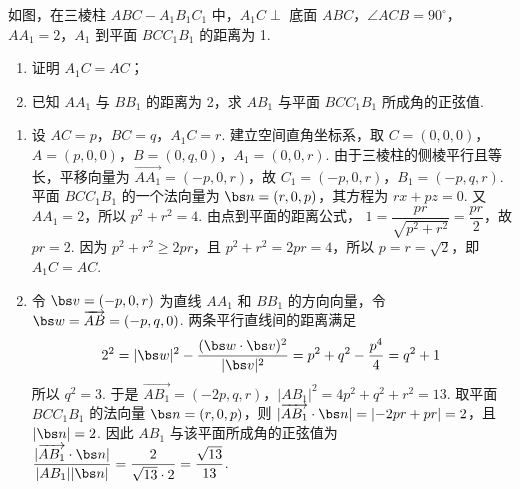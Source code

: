 \begin{problem}
如图，在三棱柱 \( ABC-A_1B_1C_1 \) 中，\( A_1C\perp \) 底面 \(ABC\)，\( \angle ACB=90^\circ \)，\( AA_1=2 \)，\(A_1\) 到平面 \(BCC_1B_1\) 的距离为 1.

\begin{enumerate}
\item 证明 \( A_1C=AC \)；
\item 已知 \(AA_1\) 与 \(BB_1\) 的距离为 2，求 \(AB_1\) 与平面 \(BCC_1B_1\) 所成角的正弦值.
\end{enumerate}

\end{problem}

\begin{solution}
\begin{enumerate}
\item 设 \(AC=p\)，\(BC=q\)，\(A_1C=r\). 建立空间直角坐标系，取
\(C=(0,0,0)\)，\(A=(p,0,0)\)，\(B=(0,q,0)\)，\(A_1=(0,0,r)\). 由于三棱柱的侧棱平行且等长，平移向量为
\(\overrightarrow{AA_1}=(-p,0,r)\)，故 \(C_1=(-p,0,r)\)，\(B_1=(-p,q,r)\). 平面 \(BCC_1B_1\) 的一个法向量为
\(\bs n=(r,0,p)\)，其方程为 \(rx+pz=0\). 又 \(AA_1=2\)，所以
\(p^2+r^2=4\). 由点到平面的距离公式，
\(1=\dfrac{pr}{\sqrt{p^2+r^2}}=\dfrac{pr}{2}\)，故 \(pr=2\). 因为
\(p^2+r^2\geq2pr\)，且 \(p^2+r^2=2pr=4\)，所以 \(p=r=\sqrt2\)，即 \(A_1C=AC\).
\item 令 \(\bs v=(-p,0,r)\) 为直线 \(AA_1\) 和 \(BB_1\) 的方向向量，令
\(\bs w=\overrightarrow{AB}=(-p,q,0)\). 两条平行直线间的距离满足
\[
2^2=\lvert\bs w\rvert^2-\frac{(\bs w\cdot\bs v)^2}{\lvert\bs v\rvert^2}
=p^2+q^2-\frac{p^4}{4}=q^2+1
\]
所以 \(q^2=3\). 于是
\(\overrightarrow{AB_1}=(-2p,q,r)\)，\(\lvert AB_1\rvert^2=4p^2+q^2+r^2=13\). 取平面 \(BCC_1B_1\) 的法向量
\(\bs n=(r,0,p)\)，则
\(\lvert\overrightarrow{AB_1}\cdot\bs n\rvert=\lvert-2pr+pr\rvert=2\)，且 \(\lvert\bs n\rvert=2\). 因此 \(AB_1\) 与该平面所成角的正弦值为
\(\dfrac{\lvert\overrightarrow{AB_1}\cdot\bs n\rvert}{\lvert AB_1\rvert\lvert\bs n\rvert}=\dfrac{2}{\sqrt{13}\cdot2}=\dfrac{\sqrt{13}}{13}\).
\end{enumerate}
\end{solution}

